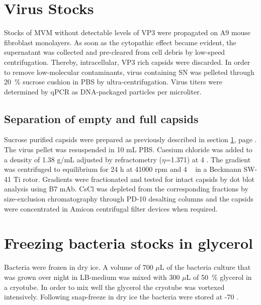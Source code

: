 
\section{Virus Stocks}
\label{Virus Stocks}
Stocks of MVM without detectable levels of VP3 were propagated on A9 mouse fibroblast monolayers. As soon as the cytopathic effect became evident, the supernatant was collected and pre-cleared from cell debris by low-speed centrifugation. Thereby, intracellular, VP3 rich capsids were discarded. In order to remove low-molecular contaminants, virus containing SN was pelleted through 20~\% sucrose cushion in PBS by ultra-centrifugation. Virus titers were determined by qPCR   as DNA-packaged particles per microliter.   

\subsection{Separation of empty and full capsids}

Sucrose purified capsids were prepared as previously described in section \ref{Virus Stocks}, page \pageref{Virus Stocks}. The virus pellet was resuspended in 10 mL PBS. Caesium chloride was added to a density of 1.38 g/mL adjusted by refractometry ($\eta$=1.371) at 4 \textcelsius. The gradient was centrifuged to equilibrium for 24 h at 41000 rpm and 4 \textcelsius~ in a Beckmann SW-41 Ti rotor. Gradients were fractionated and tested for intact capsids by dot blot analysis using B7 mAb. CsCl was depleted from the corresponding fractions by size-exclusion chromatography through PD-10 desalting columns and the capsids were concentrated in Amicon\textsuperscript{\textregistered} centrifugal filter devices when required.          
   
   








\section{Freezing bacteria stocks in glycerol}
Bacteria were frozen in dry ice. A volume of 700 $\mu$L of the bacteria culture that was grown over night in LB-medium was mixed with 300 $\mu$L of 50~\% glycerol in a cryotube. In order to mix well the glycerol the cryotube was vortexed intensively. Following snap-freeze in dry ice the bacteria were stored at -70 \textcelsius.



